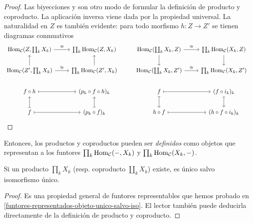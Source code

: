 \documentclass{article}
\numberwithin{equation}{section}
\theoremstyle{definition}
\begin{document}
\begin{observacion}
  \begin{proof}
    Las biyecciones  y
     son otro modo de
    formular la definición de producto y coproducto. La aplicación inversa viene
    dada por la propiedad universal. La naturalidad en $Z$ es también evidente:
    para todo morfismo $h\colon Z \to Z'$ se tienen diagramas conmuativos
    \[ \begin{tikzcd}
        \Hom_\vcateg{C} (Z, \prod_k X_k) \ar{r}{\isom} & \prod_k \Hom_\vcateg{C} (Z, X_k) & \Hom_\vcateg{C} (\coprod_k X_k, Z) \ar{r}{\isom}\ar{d} & \prod_k \Hom_\vcateg{C} (X_k, Z)\ar{d} \\
        \Hom_\vcateg{C} (Z', \prod_k X_k) \ar{r}{\isom}\ar{u} & \prod_k \Hom_\vcateg{C} (Z', X_k)\ar{u} & \Hom_\vcateg{C} (\coprod_k X_k, Z') \ar{r}{\isom} & \prod_k \Hom_\vcateg{C} (X_k, Z') \\
        f\circ h\ar[|->]{r} & (p_k\circ f\circ h)_k & f\ar[|->]{d}\ar[|->]{r} & (f\circ i_k)_k\ar[|->]{d} \\
        f \ar[|->]{r}\ar[|->]{u} & (p_k\circ f)_k \ar[|->]{u} & h\circ f \ar[|->]{r} & (h\circ f\circ i_k)_k
      \end{tikzcd} \]
  \end{proof}
\end{observacion}

Entonces, los productos y coproductos pueden ser \emph{definidos} como objetos
que representan a los funtores $\prod_k \operatorname{Hom}_\mathcal{C} (-,X_k)$ y
$\prod_k \operatorname{Hom}_\mathcal{C} (X_k,-)$.

\begin{observacion}
  Si un producto $\prod_k X_k$ (resp. coproducto $\coprod_k X_k$) existe, es
  único salvo isomorfismo único.

  \begin{proof}
    Es una propiedad general de funtores representables que hemos probado en
    \ref{funtores-representados-objeto-unico-salvo-iso}. El lector también puede
    deducirla directamente de la definición de producto y coproducto.
  \end{proof}
\end{observacion}
\end{document}
